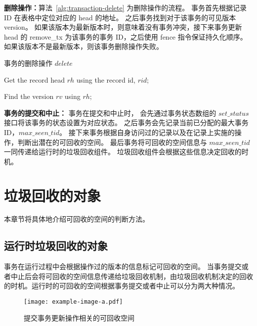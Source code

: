 \textbf{删除操作：}算法~\ref{alg:transaction-delete} 为删除操作的流程。
事务首先根据记录 ID 在表格中定位对应的 head 的地址。
之后事务找到对于该事务的可见版本 version。
如果该版本为最新版本时，则意味着没有事务冲突，接下来事务更新 head 的 remove\_tx 为该事务的事务 ID，之后使用 fence 指令保证持久化顺序。
如果该版本不是最新版本，则该事务删除操作失败。

\begin{algorithm}[h]
    \caption{事务的删除操作 $delete$}
    \label{alg:transaction-delete}
    \BlankLine
    Get the record head $rh$ using the record id, $rid$;

    Find the version $rv$ using $rh$;


\end{algorithm}

\textbf{事务的提交和中止：} 事务在提交和中止时，
会先通过事务状态数组的 $set\_status$ 接口将该事务的状态设置为对应状态。
之后事务会先记录当前已分配的最大事务 ID，$max\_seen\_tid$。
接下来事务根据自身访问过的记录以及在记录上实施的操作，判断出潜在的可回收的空间。
最后事务将可回收的空间信息与 $max\_seen\_tid$ 一同传递给运行时的垃圾回收组件。
垃圾回收组件会根据这些信息决定回收的时机。


\section{垃圾回收的对象}
\label{sec:space}

本章节将具体地介绍可回收的空间的判断方法。

\subsection{运行时垃圾回收的对象}

事务在运行过程中会根据操作过的版本的信息标记可回收的空间。
当事务提交或者中止后会将可回收的空间信息传递给垃圾回收机制，由垃圾回收机制决定的回收的时机。运行时的可回收的空间根据事务提交或者中止可以分为两大种情况。

\begin{figure}
    \centering
    \texttt{[image: example-image-a.pdf]}
    \caption{提交事务更新操作相关的可回收空间}
    \label{fig:space-commit}
\end{figure}


